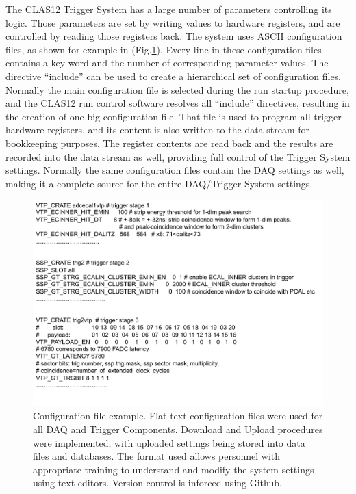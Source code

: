 The CLAS12 Trigger System has a large number of parameters controlling its logic. Those parameters are set by writing values to hardware registers, and are controlled by reading those registers back. The system uses ASCII configuration files, as shown for example in (Fig.\ref{fig:config}). Every line in these configuration files contains a key word and the number of corresponding parameter values. The directive ``include'' can be used to create a hierarchical set of configuration files. Normally the main configuration file is selected during the run startup procedure, and the CLAS12 run control software resolves all ``include'' directives, resulting in the creation of one big configuration file. That file is used to program all trigger hardware registers, and its content is also written to the data stream for bookkeeping purposes. The register contents are read back and the results are recorded into the data stream as well, providing full control of the Trigger System settings. Normally the same configuration files contain the DAQ settings as well, making it a complete source for the entire DAQ/Trigger System settings.

\begin{figure}[hbt]
	\centering
	\includegraphics[width=1.0\columnwidth,keepaspectratio]{img/config.png}
	\caption{Configuration file example. Flat text configuration files were used for all DAQ and Trigger Components. Download and Upload procedures were implemented, with uploaded settings being stored into data files and databases. The format used allows personnel with appropriate training to understand and modify the system settings using text editors. Version control is inforced using Github.}
	\label{fig:config}
\end{figure}


